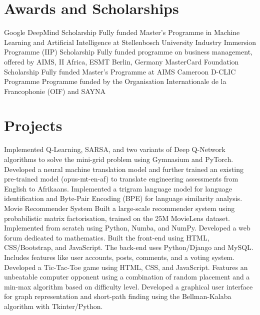 \documentclass[a4paper,oneside]{article}
\begin{document}
	\section{Awards and Scholarships}
	{Google DeepMind Scholarship}
	{Fully funded Master's Programme in Machine Learning and Artificial Intelligence at Stellenbosch University}
	{}
	{Industry Immersion Programme (IIP) Scholarship}
	{Fully funded programme on business management, offered by AIMS, II Africa, ESMT Berlin, Germany}
	{}
	{MasterCard Foundation Scholarship}
	{Fully funded Master's Programme at AIMS Cameroon}
	{}
	{D-CLIC Programme}
	{Programme funded by the Organisation Internationale de la Francophonie (OIF) and SAYNA}
	{}

	\section{Projects}
	{}
	{Implemented Q-Learning, SARSA, and two variants of Deep Q-Network algorithms to solve the mini-grid problem using Gymnasium and PyTorch.}
	{}
	{}
	{Developed a neural machine translation model and further trained an existing pre-trained model (opus-mt-en-af) to translate engineering assessments from English to Afrikaans.}
	{}
	{}
	{Implemented a trigram language model for language identification and Byte-Pair Encoding (BPE) for language similarity analysis.}
	{}
	{Movie Recommender System}
	{Built a large-scale recommender system using probabilistic matrix factorisation, trained on the 25M MovieLens dataset. Implemented from scratch using Python, Numba, and NumPy.}
	{}
	{}
	{Developed a web forum dedicated to mathematics. Built the front-end using HTML, CSS/Bootstrap, and JavaScript. The back-end uses Python/Django and MySQL. Includes features like user accounts, posts, comments, and a voting system.}
	{}
	{}
	{Developed a Tic-Tac-Toe game using HTML, CSS, and JavaScript. Features an unbeatable computer opponent using a combination of random placement and a min-max algorithm based on difficulty level.}
	{}
	{}
	{Developed a graphical user interface for graph representation and short-path finding using the Bellman-Kalaba algorithm with Tkinter/Python.}
	{}
\end{document}
